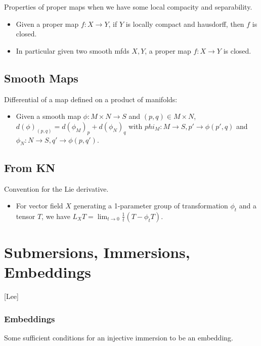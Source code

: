 \documentclass{report}
\theoremstyle{definition}
\begin{document}
Properties of proper maps when we have some local compacity and separability.
\begin{itemize}
    \item Given a proper map $f:X\to Y$, if $Y$ is locally compact and hausdorff, then $f$ is closed.
    \item\label{ProperMapIntoManifold} In particular given two smooth mfds $X,Y$, a proper map $f:X\to Y$ is closed.
\end{itemize}

\section{Smooth Maps}

Differential of a map defined on a product of manifolds:
\begin{itemize}
    \item \label{DifferentialMapOnProduct} Given a smooth map $\phi: M\times N\to S$ and $(p,q)\in M\times N$, $d(\phi)_{(p,q)}=d(\phi_M)_p+d(\phi_N)_q$ with $phi_M:M\to S,p'\to \phi(p',q)$ and $\phi_N:N\to S,q'\to\phi(p,q')$.
\end{itemize}

\section{From KN}

Convention for the Lie derivative.
\begin{itemize}
    \item For vector field $X$ generating a 1-parameter group of transformation $\phi_t$ and a tensor $T$, we have $L_XT=\lim_{t\to 0}\frac1t (T-\phi_tT)$.
\end{itemize}

\chapter{Submersions, Immersions, Embeddings}

[Lee]

\subsection{Embeddings}

Some sufficient conditions for an injective immersion to be an embedding.
\end{document}
